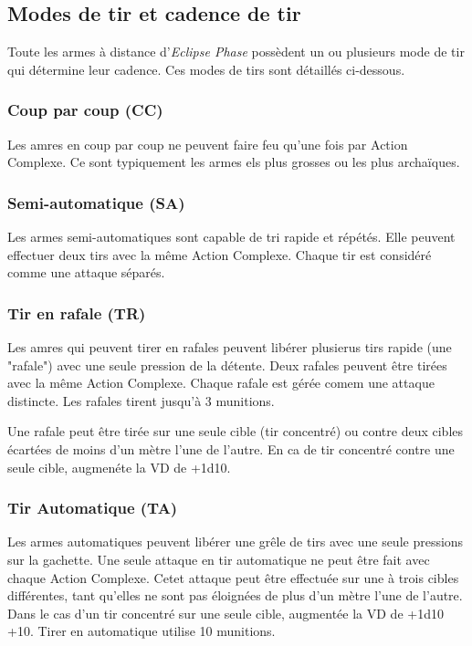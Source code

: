 \subsection{Modes de tir et cadence de tir} \label{sec:firing-modes-rate} 

Toute les armes à distance d'\emph{Eclipse Phase} possèdent un ou plusieurs mode de tir qui détermine leur cadence. Ces modes de tirs sont détaillés ci-dessous. 

\subsubsection{Coup par coup (CC)} 

Les amres en coup par coup ne peuvent faire feu qu'une fois par Action Complexe. Ce sont typiquement les armes els plus grosses ou les plus archaïques. 

\subsubsection{Semi-automatique (SA)} 

Les armes semi-automatiques sont capable de tri rapide et répétés. Elle peuvent effectuer deux tirs avec la même Action Complexe. Chaque tir est considéré comme une attaque séparés. 

\subsubsection{Tir en rafale (TR)} 

Les amres qui peuvent tirer en rafales peuvent libérer plusierus tirs rapide (une "rafale") avec une seule pression de la détente. Deux rafales peuvent être tirées avec la même Action Complexe. Chaque rafale est gérée comem une attaque distincte. Les rafales tirent jusqu'à 3 munitions. 

Une rafale peut être tirée sur une seule cible (tir concentré) ou contre deux cibles écartées de moins d'un mètre l'une de l'autre. En ca de tir concentré contre une seule cible, augmenéte la VD de +1d10. 

\subsubsection{Tir Automatique (TA)} 

Les armes automatiques peuvent libérer une grêle de tirs avec une seule pressions sur la gachette. Une seule attaque en tir automatique ne peut être fait avec chaque Action Complexe. Cetet attaque peut être effectuée sur une à trois cibles différentes, tant qu'elles ne sont pas éloignées de plus d'un mètre l'une de l'autre. Dans le cas d'un tir concentré sur une seule cible, augmentée la VD de +1d10 +10. Tirer en automatique utilise 10 munitions. 

